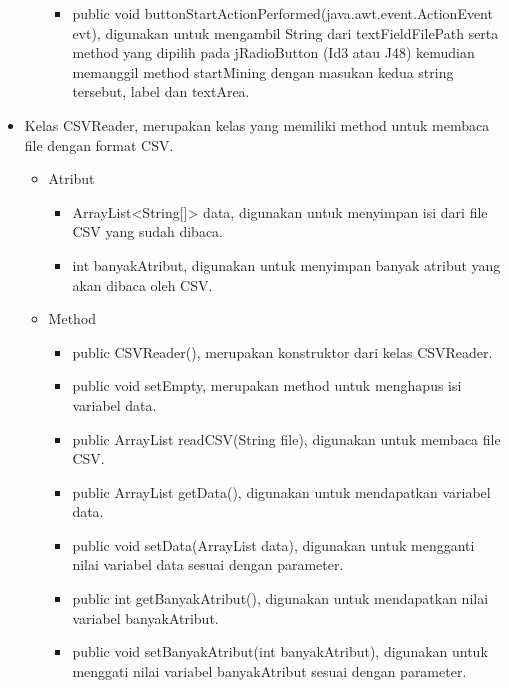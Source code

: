 \begin{itemize}
\begin{itemize}
\begin{itemize}
			\item public void buttonStartActionPerformed(java.awt.event.ActionEvent evt), digunakan untuk mengambil String dari textFieldFilePath serta method yang dipilih pada jRadioButton (Id3 atau J48) kemudian memanggil method startMining dengan masukan kedua string tersebut, label dan textArea.
		\end{itemize}
	\end{itemize}

	\item Kelas CSVReader, merupakan kelas yang memiliki method untuk membaca file dengan format CSV.
	\begin{itemize}
		\item Atribut
		\begin{itemize}
			\item ArrayList<String[]> data, digunakan untuk menyimpan isi dari file CSV yang sudah dibaca.
			\item int banyakAtribut, digunakan untuk menyimpan banyak atribut yang akan dibaca oleh CSV.
		\end{itemize}
		\item Method
		\begin{itemize}
			\item public CSVReader(), merupakan konstruktor dari kelas CSVReader.
			\item public void setEmpty, merupakan method untuk menghapus isi variabel data.
			\item public ArrayList readCSV(String file), digunakan untuk membaca file CSV.
			\item public ArrayList getData(), digunakan untuk mendapatkan variabel data.
			\item public void setData(ArrayList data), digunakan untuk mengganti nilai variabel data sesuai dengan parameter.
			\item public int getBanyakAtribut(), digunakan untuk mendapatkan nilai variabel banyakAtribut.
			\item public void setBanyakAtribut(int banyakAtribut), digunakan untuk menggati nilai variabel banyakAtribut sesuai dengan parameter.
		\end{itemize}
	\end{itemize}


\end{itemize}
